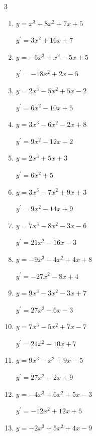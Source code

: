 \begin{multicols}{3}
\begin{enumerate}
        $\displaystyle y^{\prime}=-27x^{2}+7$

  \item $y=x^{3}+8x^{2}+7x+5$

        $\displaystyle y^{\prime}=3x^{2}+16x+7$

\columnbreak %

  \item $y=-6x^{3}+x^{2}-5x+5$

        $\displaystyle y^{\prime}=-18x^{2}+2x-5$

  \item $y=2x^{3}-5x^{2}+5x-2$

        $\displaystyle y^{\prime}=6x^{2}-10x+5$

  \item $y=3x^{3}-6x^{2}-2x+8$

        $\displaystyle y^{\prime}=9x^{2}-12x-2$

  \item $y=2x^{3}+5x+3$

        $\displaystyle y^{\prime}=6x^{2}+5$

  \item $y=3x^{3}-7x^{2}+9x+3$

        $\displaystyle y^{\prime}=9x^{2}-14x+9$

  \item $y=7x^{3}-8x^{2}-3x-6$

        $\displaystyle y^{\prime}=21x^{2}-16x-3$

  \item $y=-9x^{3}-4x^{2}+4x+8$

        $\displaystyle y^{\prime}=-27x^{2}-8x+4$

  \item $y=9x^{3}-3x^{2}-3x+7$

        $\displaystyle y^{\prime}=27x^{2}-6x-3$

  \item $y=7x^{3}-5x^{2}+7x-7$

        $\displaystyle y^{\prime}=21x^{2}-10x+7$

  \item $y=9x^{3}-x^{2}+9x-5$

        $\displaystyle y^{\prime}=27x^{2}-2x+9$

  \item $y=-4x^{3}+6x^{2}+5x-3$

        $\displaystyle y^{\prime}=-12x^{2}+12x+5$

  \item $y=-2x^{3}+5x^{2}+4x-9$


\end{enumerate}
\end{multicols}
